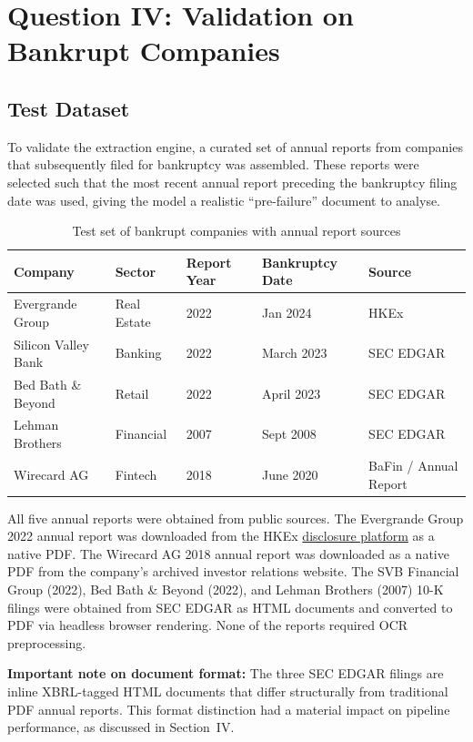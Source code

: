 \documentclass[12pt,a4paper]{article}
\begin{document}
\section{Question IV: Validation on Bankrupt Companies}

\subsection{Test Dataset}

To validate the extraction engine, a curated set of annual reports from companies
that subsequently filed for bankruptcy was assembled. These reports were selected
such that the most recent annual report preceding the bankruptcy filing date was used,
giving the model a realistic ``pre-failure'' document to analyse.

\begin{table}[H]
\centering
\begin{tabular}{p{3.5cm} p{2.5cm} p{2.5cm} p{2.5cm} p{2.5cm}}
\toprule
\textbf{Company} & \textbf{Sector} & \textbf{Report Year} & \textbf{Bankruptcy Date} & \textbf{Source} \\
\midrule
Evergrande Group & Real Estate & 2022 & Jan 2024 & HKEx \\
Silicon Valley Bank & Banking & 2022 & March 2023 & SEC EDGAR \\
Bed Bath \& Beyond & Retail & 2022 & April 2023 & SEC EDGAR \\
Lehman Brothers & Financial & 2007 & Sept 2008 & SEC EDGAR \\
Wirecard AG & Fintech & 2018 & June 2020 & BaFin / Annual Report \\
\bottomrule
\end{tabular}
\caption{Test set of bankrupt companies with annual report sources}
\end{table}

All five annual reports were obtained from public sources. The Evergrande
Group 2022 annual report was downloaded from the HKEx
\href{https://www.hkexnews.hk}{disclosure platform} as a native PDF. The
Wirecard AG 2018 annual report was downloaded as a native PDF from the
company's archived investor relations website. The SVB Financial Group
(2022), Bed Bath \& Beyond (2022), and Lehman Brothers (2007) 10-K filings
were obtained from SEC EDGAR as HTML documents and converted to PDF via
headless browser rendering. None of the reports required OCR preprocessing.

\textbf{Important note on document format:} The three SEC EDGAR filings are
inline XBRL-tagged HTML documents that differ structurally from traditional
PDF annual reports. This format distinction had a material impact on pipeline
performance, as discussed in Section~IV.
\end{document}
